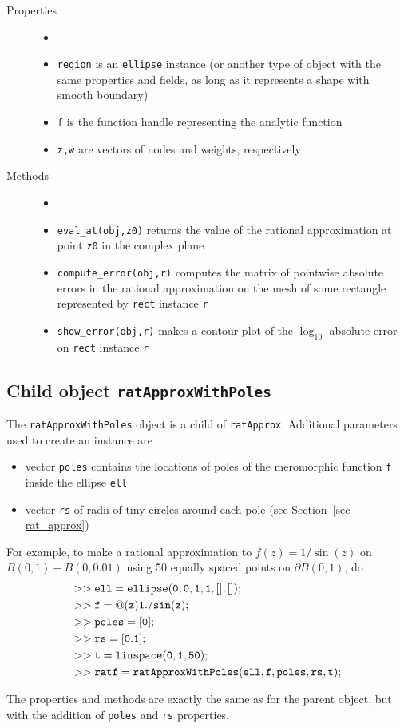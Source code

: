 \begin{description}
 \item[Properties]
   \begin{itemize}
    \item[]
    \item {\tt region} is an {\tt ellipse} instance (or another
          type of object with the same properties and fields, as
          long as it represents a shape with smooth boundary)
    \item {\tt f} is the function handle representing the analytic
          function
    \item {\tt z,w} are vectors of nodes and weights, respectively
   \end{itemize}
 \item[Methods]
   \begin{itemize}
    \item[]
    \item {\tt eval\_at(obj,z0)} returns the value of the rational
          approximation at point {\tt z0} in the complex plane
    \item {\tt compute\_error(obj,r)} computes the matrix of 
          pointwise absolute errors
          in the rational approximation on the mesh of
          some rectangle represented by
          {\tt rect} instance {\tt r}
    \item {\tt show\_error(obj,r)} makes a contour plot of the $\log_{10}$
          absolute error on {\tt rect} instance {\tt r}
   \end{itemize}
\end{description}

\subsection{Child object {\tt ratApproxWithPoles}}

The {\tt ratApproxWithPoles} object is a child of {\tt ratApprox}.
Additional parameters used to create an instance are
\begin{itemize}
 \item vector {\tt poles} contains the locations of poles of
       the meromorphic function {\tt f} inside the ellipse {\tt ell}
 \item vector {\tt rs} of radii of tiny circles around each pole
       (see Section~\ref{sec-rat_approx})    
\end{itemize}
For example, to make a rational approximation to $f(z) = 1/\sin(z)$
on $B(0,1) - B(0,0.01)$ using 50 equally spaced points on
$\partial B(0,1)$, do
\begin{equation}
\begin{aligned}
 &{\tt >> ell = ellipse(0,0,1,1,[],[]);} \\ 
 &{\tt >> f = @(z) 1./sin(z);} \\ 
 &{\tt >> poles = [0];} \\
 &{\tt >> rs = [0.1];} \\ 
 &{\tt >> t = linspace(0,1,50);} \\ 
 &{\tt >> ratf = ratApproxWithPoles(ell,f,poles,rs,t);}
\end{aligned}
\end{equation}

The properties and methods are exactly the same as for the parent object,
but with the addition of {\tt poles} and {\tt rs} properties.
